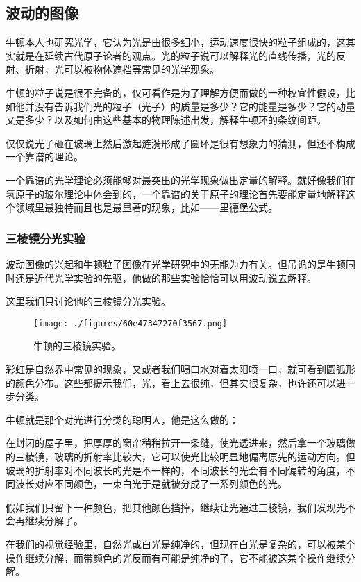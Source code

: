 \subsection{波动的图像}

牛顿本人也研究光学，它认为光是由很多细小，运动速度很快的粒子组成的，这其实就是在延续古代原子论者的观点。光的粒子说可以解释光的直线传播，光的反射、折射，光可以被物体遮挡等常见的光学现象。

牛顿的粒子说是很不完备的，仅可看作是为了理解方便而做的一种权宜性假设，比如他并没有告诉我们光的粒子（光子）的质量是多少？它的能量是多少？它的动量又是多少？以及如何由这些基本的物理陈述出发，解释牛顿环的条纹间距。

仅仅说光子砸在玻璃上然后激起涟漪形成了圆环是很有想象力的猜测，但还不构成一个靠谱的理论。

一个靠谱的光学理论必须能够对最突出的光学现象做出定量的解释。就好像我们在氢原子的玻尔理论中体会到的，一个靠谱的关于原子的理论首先要能定量地解释这个领域里最独特而且也是最显著的现象，比如——里德堡公式。

\subsubsection{三棱镜分光实验}

波动图像的兴起和牛顿粒子图像在光学研究中的无能为力有关。但吊诡的是牛顿同时还是近代光学实验的先驱，他做的那些实验恰恰可以用波动说去解释。

这里我们只讨论他的三棱镜分光实验。

\begin{figure}[ht]
\centering
\texttt{[image: ./figures/60e47347270f3567.png]}
\caption{⽜顿的三棱镜实验。} \label{fig_QMPre5_4}
\end{figure}

彩虹是自然界中常见的现象，又或者我们喝口水对着太阳喷一口，就可看到圆弧形的颜色分布。这些都提示我们，光，看上去很纯，但其实很复杂，也许还可以进一步分类。

牛顿就是那个对光进行分类的聪明人，他是这么做的：

在封闭的屋子里，把厚厚的窗帘稍稍拉开一条缝，使光透进来，然后拿一个玻璃做的三棱镜，玻璃的折射率比较大，它可以使光比较明显地偏离原先的运动方向。但玻璃的折射率对不同波长的光是不一样的，不同波长的光会有不同偏转的角度，不同波长对应不同颜色，一束白光于是就被分成了一系列颜色的光。

假如我们只留下一种颜色，把其他颜色挡掉，继续让光通过三棱镜，我们发现光不会再继续分解了。

在我们的视觉经验里，自然光或白光是纯净的，但现在白光是复杂的，可以被某个操作继续分解，而带颜色的光反而有可能是纯净的了，它不能被这某个操作继续分解。

